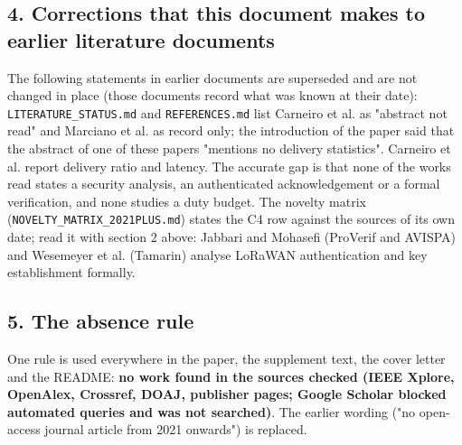 \subsection*{4. Corrections that this document makes to earlier literature documents}

The following statements in earlier documents are superseded and are not changed in place (those documents record what was known at their date): \texttt{LITERATURE\_STATUS.md} and \texttt{REFERENCES.md} list Carneiro et al. as "abstract not read" and Marciano et al. as record only; the introduction of the paper said that the abstract of one of these papers "mentions no delivery statistics". Carneiro et al. report delivery ratio and latency. The accurate gap is that none of the works read states a security analysis, an authenticated acknowledgement or a formal verification, and none studies a duty budget. The novelty matrix (\texttt{NOVELTY\_MATRIX\_2021PLUS.md}) states the C4 row against the sources of its own date; read it with section 2 above: Jabbari and Mohasefi (ProVerif and AVISPA) and Wesemeyer et al. (Tamarin) analyse LoRaWAN authentication and key establishment formally.

\subsection*{5. The absence rule}

One rule is used everywhere in the paper, the supplement text, the cover letter and the README: \textbf{no work found in the sources checked (IEEE Xplore, OpenAlex, Crossref, DOAJ, publisher pages; Google Scholar blocked automated queries and was not searched)}. The earlier wording ("no open-access journal article from 2021 onwards") is replaced.

